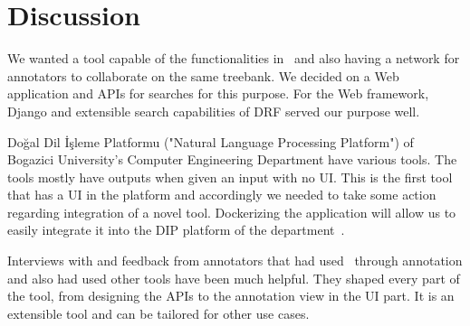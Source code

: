 \section{Discussion}
\label{sec:discussion}

We wanted a tool capable of the functionalities in \boatvone\ and also having a network for annotators to collaborate on the same treebank.
We decided on a Web application and APIs for searches for this purpose.
For the Web framework, Django and extensible search capabilities of DRF served our purpose well.

Doğal Dil İşleme Platformu ("Natural Language Processing Platform") of Bogazici University's Computer Engineering Department have various tools.
The tools mostly have outputs when given an input with no UI.
This is the first tool that has a UI in the platform and accordingly we needed to take some action regarding integration of a novel tool.
Dockerizing the application will allow us to easily integrate it into the DIP platform of the department~\cite{DIP}.

Interviews with and feedback from annotators that had used \boatvone\ through \bountreebank{} annotation and also had used other tools have been much helpful.
They shaped every part of the tool, from designing the APIs to the annotation view in the UI part.
It is an extensible tool and can be tailored for other use cases.
